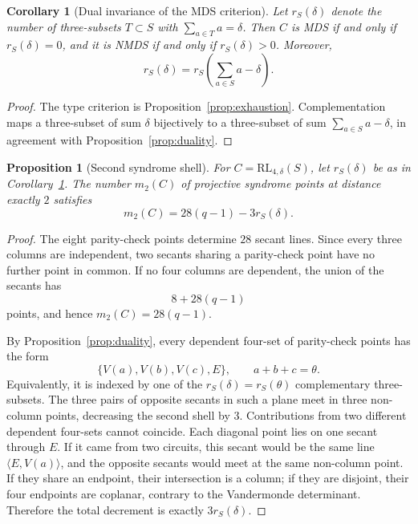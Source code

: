 \documentclass[11pt]{article}
\newcommand{\RL}{\mathrm{RL}}
\theoremstyle{plain}
\newtheorem{proposition}{Proposition}
\newtheorem{corollary}{Corollary}
\theoremstyle{definition}
\begin{document}
\begin{corollary}[Dual invariance of the MDS criterion]
\label{cor:duality-mds}
Let \(r_S(\delta)\) denote the number of three-subsets \(T\subset S\) with
\(\sum_{a\in T}a=\delta\).  Then \(C\) is MDS if and only if
\(r_S(\delta)=0\), and it is NMDS if and only if \(r_S(\delta)>0\).
Moreover,
\[
  r_S(\delta)=r_S\left(\sum_{a\in S}a-\delta\right).
\]
\end{corollary}

\begin{proof}
The type criterion is Proposition~\ref{prop:exhaustion}.  Complementation
maps a three-subset of sum \(\delta\) bijectively to a three-subset of sum
\(\sum_{a\in S}a-\delta\), in agreement with
Proposition~\ref{prop:duality}.
\end{proof}

\begin{proposition}[Second syndrome shell]\label{prop:second-shell}
For \(C=\RL_{4,\delta}(S)\), let \(r_S(\delta)\) be as in
Corollary~\ref{cor:duality-mds}.  The number \(m_2(C)\) of projective
syndrome points at distance exactly \(2\) satisfies
\[
  m_2(C)=28(q-1)-3r_S(\delta).
\]
\end{proposition}

\begin{proof}
The eight parity-check points determine \(28\) secant lines.  Since every
three columns are independent, two secants sharing a parity-check point have
no further point in common.  If no four columns are dependent, the union of
the secants has
\[
  8+28(q-1)
\]
points, and hence \(m_2(C)=28(q-1)\).

By Proposition~\ref{prop:duality}, every dependent four-set of parity-check
points has the form
\[
  \{V(a),V(b),V(c),E\},\qquad a+b+c=\theta.
\]
Equivalently, it is indexed by one of the
\(r_S(\delta)=r_S(\theta)\) complementary three-subsets.
The three pairs of opposite secants in such a plane meet in three
non-column points, decreasing the second shell by \(3\).  Contributions from
two different dependent four-sets cannot coincide.  Each diagonal point
lies on one secant through \(E\).  If it came from two circuits, this
secant would be the same line \(\langle E,V(a)\rangle\), and the opposite
secants would meet at the same non-column point.  If they share an endpoint,
their intersection is a column; if they are disjoint, their four endpoints
are coplanar, contrary to the Vandermonde determinant.
Therefore the total decrement is exactly \(3r_S(\delta)\).
\end{proof}
\end{document}
